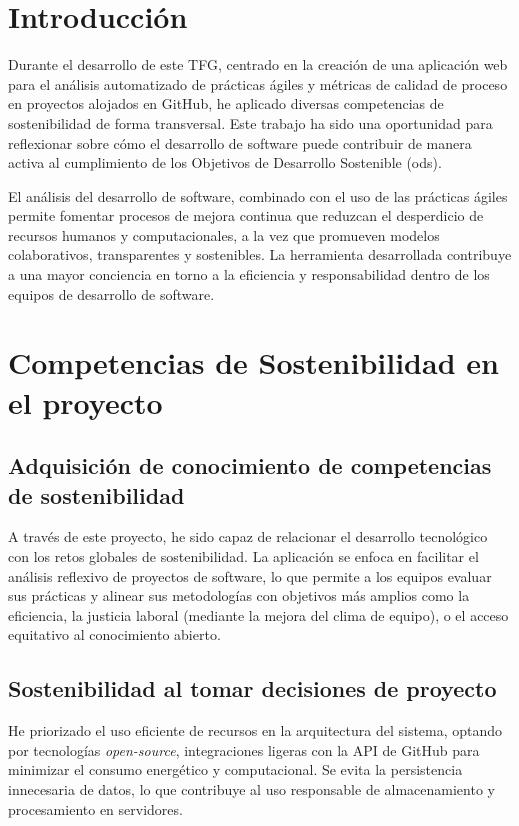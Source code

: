 
\section{Introducción}
Durante el desarrollo de este TFG, centrado en la creación de una aplicación web para el análisis automatizado de prácticas ágiles y métricas de calidad de proceso en proyectos alojados en GitHub, he aplicado diversas competencias de sostenibilidad de forma transversal. Este trabajo ha sido una oportunidad para reflexionar sobre cómo el desarrollo de software puede contribuir de manera activa al cumplimiento de los Objetivos de Desarrollo Sostenible (\acrfull{ods}).

El análisis del desarrollo de software, combinado con el uso de las prácticas ágiles permite fomentar procesos de mejora continua que reduzcan el desperdicio de recursos humanos y computacionales, a la vez que promueven modelos colaborativos, transparentes y sostenibles. La herramienta desarrollada contribuye a una mayor conciencia en torno a la eficiencia y responsabilidad dentro de los equipos de desarrollo de software.

\section{Competencias de Sostenibilidad en el proyecto}

\subsection{Adquisición de conocimiento de competencias de sostenibilidad}
A través de este proyecto, he sido capaz de relacionar el desarrollo tecnológico con los retos globales de sostenibilidad. La aplicación se enfoca en facilitar el análisis reflexivo de proyectos de software, lo que permite a los equipos evaluar sus prácticas y alinear sus metodologías con objetivos más amplios como la eficiencia, la justicia laboral (mediante la mejora del clima de equipo), o el acceso equitativo al conocimiento abierto.

\subsection{Sostenibilidad al tomar decisiones de proyecto}
He priorizado el uso eficiente de recursos en la arquitectura del sistema, optando por tecnologías \textit{open-source}, integraciones ligeras con la API de GitHub para minimizar el consumo energético y computacional. Se evita la persistencia innecesaria de datos, lo que contribuye al uso responsable de almacenamiento y procesamiento en servidores.

